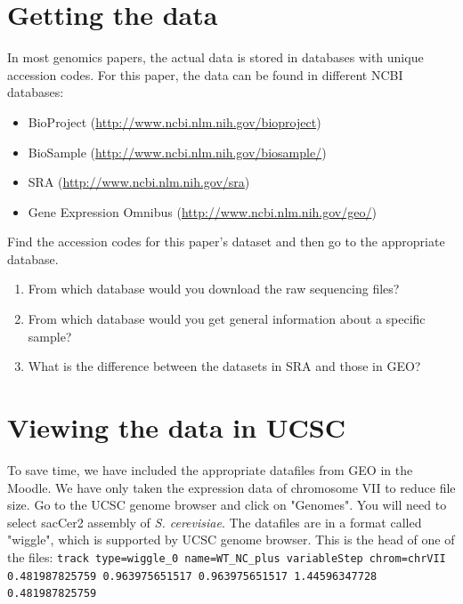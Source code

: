 \documentclass[a4paper,11pt]{article}
\begin{document}
\section{Getting the data}
\indent In most genomics papers, the actual data is stored in databases with unique accession codes. For this paper, the data can be found in different NCBI databases:
\begin{itemize}
\item BioProject (\url{http://www.ncbi.nlm.nih.gov/bioproject})
\item BioSample (\url{http://www.ncbi.nlm.nih.gov/biosample/})
\item SRA (\url{http://www.ncbi.nlm.nih.gov/sra})
\item Gene Expression Omnibus (\url{http://www.ncbi.nlm.nih.gov/geo/})
\end{itemize}

 Find the accession codes for this paper's dataset and then go to the appropriate database.

\begin{enumerate}
\item From which database would you download the raw sequencing files?
\item From which database would you get general information about a specific sample?
\item What is the difference between the datasets in SRA and those in GEO?
\end{enumerate}

\section{Viewing the data in UCSC}
To save time, we have included the appropriate datafiles from GEO in the Moodle. We have only taken the expression data of chromosome VII to reduce file size. Go to the UCSC genome browser and click on "Genomes". You will need to select sacCer2 assembly of \textit{S. cerevisiae}. The datafiles are in a format called "wiggle", which is supported by UCSC genome browser. This is the head of one of the files:
\newline
\newline
\noindent\texttt{track type=wiggle\_0 name=WT\_NC\_plus\newline
variableStep chrom=chrVII 0.481987825759 0.963975651517 0.963975651517 1.44596347728 0.481987825759\newline}
\end{document}
